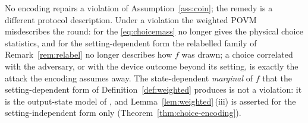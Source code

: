 
\begin{remark}\label{rem:coin-scope}
No encoding repairs a violation of Assumption~\ref{ass:coin}; the remedy is a
different protocol description. Under a violation the weighted POVM
misdescribes the round: for the 
\eqref{eq:choicemass} no longer gives the physical choice statistics, and for
the setting-dependent form the relabelled family of Remark~\ref{rem:relabel}
no longer describes how $f$ was drawn; a choice correlated with the adversary,
or with the device outcome beyond its setting, is exactly the attack the
encoding assumes away. The state-dependent \emph{marginal} of $f$
that the setting-dependent form of Definition~\ref{def:weighted} produces is
not a violation: it is the output-state model of
, and
Lemma~\ref{lem:weighted}\,(iii) is asserted for the setting-independent form
only (Theorem~\ref{thm:choice-encoding}).
\end{remark}
